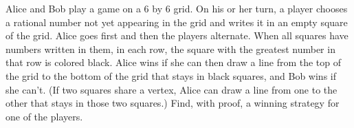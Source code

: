 Alice and Bob play a game on a 6 by 6 grid.  On his or her turn, a player chooses a rational number not yet appearing in the grid and writes it in an empty square of the grid.  Alice goes first and then the players alternate.  When all squares have numbers written in them, in each row, the square with the greatest number in that row is colored black.  Alice wins if she can then draw a line from the top of the grid to the bottom of the grid that stays in black squares, and Bob wins if she can't.  (If two squares share a vertex, Alice can draw a line from one to the other that stays in those two squares.)  Find, with proof, a winning strategy for one of the players.